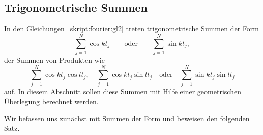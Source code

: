 \subsection{Trigonometrische Summen}
In den Gleichungen~\eqref{skript:fourier:gl2} treten trigonometrische Summen
der Form
\begin{equation}
\sum_{j=1}^N \cos kt_j
\qquad
\text{oder}
\qquad
\sum_{j=1}^N \sin kt_j,
\label{skript:fourier:trigosum}
\end{equation}
der Summen von Produkten wie
\begin{equation}
\sum_{j=1}^N \cos kt_j\cos lt_j,\quad
\sum_{j=1}^N \cos kt_j\sin lt_j
\quad
\text{oder}
\quad
\sum_{j=1}^N \sin kt_j\sin lt_j
\label{fourier:produkte}
\end{equation}
auf.
In diesem Abschnitt sollen diese Summen mit Hilfe einer geometrischen
Überlegung berechnet werden.

Wir befassen uns zunächst mit Summen der Form
\label{skript:fourier:trigosum} und beweisen den folgenden Satz.

